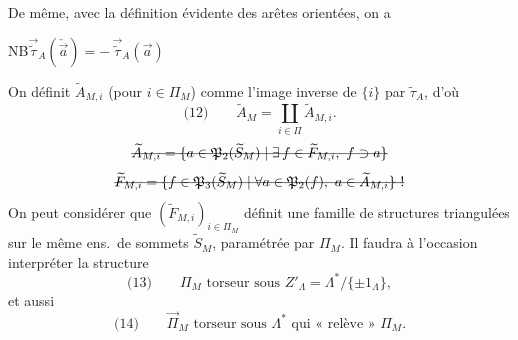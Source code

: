 \documentclass[11pt,a4paper]{article}
\begin{document}

De même, avec la définition évidente des arêtes orientées, on a


NB\quad $\vec{\widetilde{\tau}}_A(\check{\vec{a}}) = -\,\vec{\widetilde{\tau}}_A(\vec{a})$

On définit $\widetilde{A}_{M,i}$ \struck{\ill{}} (pour $i\in\Pi_M$) comme l'image inverse de $\{i\}$ par $\widetilde{\tau}_A$, d'où
\[
\text{(12)}\qquad \widetilde{A}_M = \coprod_{i\in\Pi}\widetilde{A}_{M,i} .
\]
\[
\text{\struck{$\widetilde{A}_{M,i} = \{a\in\mathfrak{P}_2(\widetilde{S}_M)\mid \exists\, f\in\widetilde{F}_{M,i},\ f\supset a\}$}}
\]
\[
\text{\struck{$\widetilde{F}_{M,i} = \{f\in\mathfrak{P}_3(\widetilde{S}_M)\mid \forall a\in\mathfrak{P}_2(f),\ a\in\widetilde{A}_{M,i}\}$ !}}
\]
\struck{\ill{}} On peut considérer que $(\widetilde{F}_{M,i})_{i\in\Pi_M}$ définit une famille de structures triangulées sur le même ens.\ de sommets $\widetilde{S}_M$, paramétrée par $\Pi_M$. Il faudra à l'occasion interpréter la structure
\[
\text{(13)}\qquad \Pi_M \text{ torseur sous } Z'_\Lambda = \Lambda^{*}/\{\pm1_\Lambda\},
\]
et aussi
\[
\text{(14)}\qquad \overrightarrow{\Pi}_M \text{ torseur sous } \Lambda^{*} \text{ qui « relève » } \Pi_M .
\]
\end{document}
